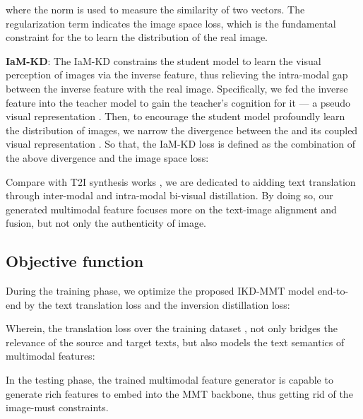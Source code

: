 \documentclass[11pt]{article}
\begin{document}
where the  norm  is used to measure the similarity of two vectors. The regularization term  indicates the image space loss, which is the fundamental constraint for the  to learn the distribution of the real image.


\textbf{IaM-KD}:
The IaM-KD constrains the student model  to learn the visual perception of images via the inverse feature, thus relieving the intra-modal gap between the inverse feature with the real image.
Specifically, we fed the inverse feature  into the teacher model  to gain the teacher’s cognition for it --- a pseudo visual representation .
Then, to encourage the student model profoundly learn the distribution of images, we narrow the divergence between the  and its coupled visual representation .
So that, the IaM-KD loss is defined as the combination of the above divergence and the image space loss:


Compare with T2I synthesis works \cite{reed2016generative,zhang2017stackgan,xu2018attngan}, we are dedicated to aidding text translation through inter-modal and intra-modal bi-visual distillation.
By doing so, our generated multimodal feature focuses more on the text-image alignment and fusion, but not only the authenticity of image.


\subsection{Objective function}
During the training phase, we optimize the proposed IKD-MMT model end-to-end by the text translation loss and the inversion distillation loss:


Wherein, the translation loss over the training dataset , not only bridges the relevance of the source and target texts, but also models the text semantics of multimodal features:


In the testing phase, the trained multimodal feature generator is capable to generate rich features to embed into the MMT backbone, thus getting rid of the image-must constraints.
\end{document}
